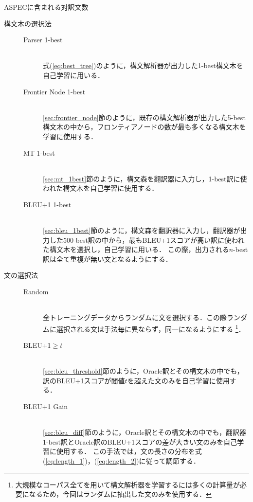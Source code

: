 \documentclass[japanese]{jnlp_1.4}
\begin{document}
\begin{table}[b]
\caption{ASPECに含まれる対訳文数}
\label{tab:ASPEC}

\end{table}

\begin{description}
\item[構文木の選択法]\mbox{}
	\begin{description}
	\item[Parser 1-best]\mbox{}\\
		式(\ref{eq:best_tree})のように，構文解析器が出力した1-best構文木を自己学習に用いる．
	\item[Frontier Node 1-best]\mbox{}\\
		\ref{sec:frontier_node}節のように，既存の構文解析器が出力した5-best構文木の中から，フロンティアノードの数が最も多くなる構文木を学習に使用する．
	\item[MT 1-best]\mbox{}\\
		\ref{sec:mt_1best}節のように，構文森を翻訳器に入力し，1-best訳に使われた構文木を自己学習に使用する．
	\item[BLEU+1 1-best]\mbox{}\\
		\ref{sec:bleu_1best}節のように，構文森を翻訳器に入力し，翻訳器が出力した500-best訳の中から，最もBLEU+1スコアが高い訳に使われた構文木を選択し，自己学習に用いる．
		この際，出力される$n$-best訳は全て重複が無い文となるようにする．
	\end{description}
\item[文の選択法]\mbox{}
\begin{description}
	\item[Random]\mbox{}\\
		全トレーニングデータからランダムに文を選択する．この際ランダムに選択される文は手法毎に異ならず，同一になるようにする
		\footnote{大規模なコーパス全てを用いて構文解析器を学習するには多くの計算量が必要になるため，今回はランダムに抽出した文のみを使用する．}．
	\item[BLEU+1$\geq t$]\mbox{}\\
		\ref{sec:bleu_threshold}節のように，Oracle訳とその構文木の中でも，訳のBLEU+1スコアが閾値$t$を超えた文のみを自己学習に使用する．
	\item[BLEU+1 Gain]\mbox{}\\
		\ref{sec:bleu_diff}節のように，Oracle訳とその構文木の中でも，翻訳器1-best訳とOracle訳のBLEU+1スコアの差が大きい文のみを自己学習に使用する．
		この手法では，文の長さの分布を式(\ref{eq:length_1})，(\ref{eq:length_2})に従って調節する．
\end{description}
\end{description}
\end{document}
